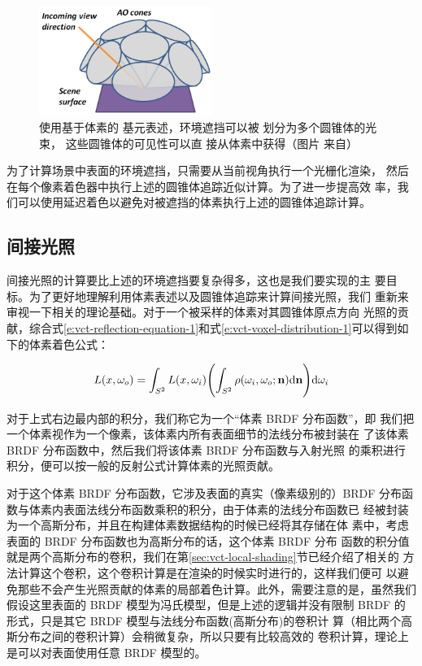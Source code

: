 \begin{figure}
	\sidecaption
	\includegraphics[width=0.5\textwidth]{figures/vct/vct-14-1}
	\caption{使用基于体素的 基元表述，环境遮挡可以被 划分为多个圆锥体的光束， 这些圆锥体的可见性可以直 接从体素中获得（图片 来自\cite{a:InteractiveIndirectIlluminationUsingVoxelConeTracing}）}
	\label{f:vct-14-1}
\end{figure}

为了计算场景中表面的环境遮挡，只需要从当前视角执行一个光栅化渲染， 然后在每个像素着色器中执行上述的圆锥体追踪近似计算。为了进一步提高效 率，我们可以使用延迟着色以避免对被遮挡的体素执行上述的圆锥体追踪计算。



\subsection{间接光照}
间接光照的计算要比上述的环境遮挡要复杂得多，这也是我们要实现的主 要目标。为了更好地理解利用体素表述以及圆锥体追踪来计算间接光照，我们 重新来审视一下相关的理论基础。对于一个被采样的体素对其圆锥体原点方向 光照的贡献，综合式\ref{e:vct-reflection-equation-1}和式\ref{e:vct-voxel-distribution-1}可以得到如下的体素着色公式：

\begin{equation}\label{e:vct-voxel-shading}
	L({x},\omega_o)=\int_{S^{2}}L(x,\omega_i)\Biggl(\int_{S^{2}}\rho(\omega_i,\omega_o;\mathbf{n}){\rm d}\mathbf{n}\Biggl){\rm d}\omega_i
\end{equation}

对于上式右边最内部的积分，我们称它为一个“体素 BRDF 分布函数”，即 我们把一个体素视作为一个像素，该体素内所有表面细节的法线分布被封装在 了该体素 BRDF 分布函数中，然后我们将该体素 BRDF 分布函数与入射光照 的乘积进行积分，便可以按一般的反射公式计算体素的光照贡献。

对于这个体素 BRDF 分布函数，它涉及表面的真实（像素级别的）BRDF 分布函数与体素内表面法线分布函数乘积的积分，由于体素的法线分布函数已 经被封装为一个高斯分布，并且在构建体素数据结构的时候已经将其存储在体 素中，考虑表面的 BRDF 分布函数也为高斯分布的话，这个体素 BRDF 分布 函数的积分值就是两个高斯分布的卷积，我们在第\ref{sec:vct-local-shading}节已经介绍了相关的 方法计算这个卷积，这个卷积计算是在渲染的时候实时进行的，这样我们便可 以避免那些不会产生光照贡献的体素的局部着色计算。此外，需要注意的是，虽然我们假设这里表面的 BRDF 模型为冯氏模型，但是上述的逻辑并没有限制 BRDF 的形式，只是其它 BRDF 模型与法线分布函数(高斯分布)的卷积计 算（相比两个高斯分布之间的卷积计算）会稍微复杂，所以只要有比较高效的 卷积计算，理论上是可以对表面使用任意 BRDF 模型的。


